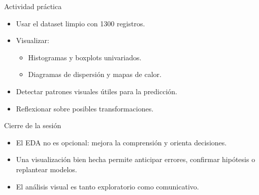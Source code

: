 \documentclass{beamer}
\begin{document}
\begin{frame}{Actividad práctica}
\begin{itemize}
    \item Usar el dataset limpio con 1300 registros.
    \item Visualizar:
    \begin{itemize}
        \item Histogramas y boxplots univariados.
        \item Diagramas de dispersión y mapas de calor.
    \end{itemize}
    \item Detectar patrones visuales útiles para la predicción.
    \item Reflexionar sobre posibles transformaciones.
\end{itemize}
\end{frame}

\begin{frame}{Cierre de la sesión}
\begin{itemize}
    \item El EDA no es opcional: mejora la comprensión y orienta decisiones.
    \item Una visualización bien hecha permite anticipar errores, confirmar hipótesis o replantear modelos.
    \item El análisis visual es tanto exploratorio como comunicativo.
\end{itemize}
\end{frame}
\end{document}
